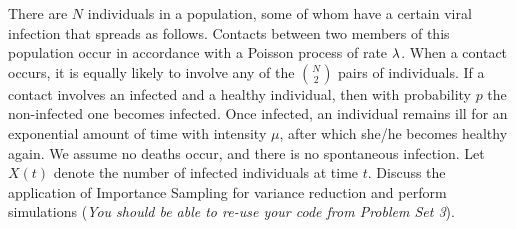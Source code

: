 \documentclass[12pt]{article}
\begin{document}
\begin{problem} 
There are $N$ individuals in a population, some of whom have a certain
viral infection that spreads as follows. Contacts between two members of
this population occur in accordance with a Poisson process of rate
${\lambda}$. When a contact occurs, it is equally likely to involve any of the
$N\choose2$ pairs of individuals. If a contact involves an infected and
a healthy individual, then with probability $p$ the non-infected one
becomes infected. Once infected, an individual remains ill for an
exponential amount of time with intensity $\mu$, after which she/he
becomes healthy again. We assume no deaths occur, and there is no
spontaneous infection. Let $X(t)$ denote the number of infected
individuals at time $t$. 
Discuss the application of Importance Sampling for variance reduction
and perform simulations ({\it You should be able to re-use your code
from Problem Set 3}). 
\end{problem}
\end{document}
